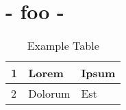 \documentclass[titlepage]{article}
\begin{document}
  \section{ {{- foo -}} }

  \begin{table}[htbp]
    \centering
    \begin{tabularx}{\textwidth}{| p{1cm} | X | p{6cm} |}
      \hline
        1 & Lorem
          & Ipsum \\ \hline
        2 & Dolorum
          & Est \\ \hline
    \end{tabularx}
    \caption{Example Table}\label{tbl:example_table}
  \end{table}

  
\end{document}
